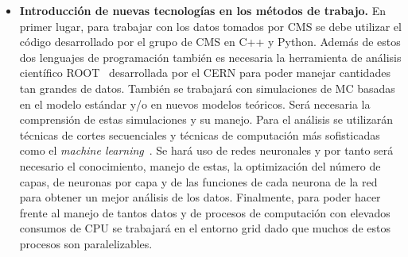 \documentclass[11pt]{articulo}
\begin{document}
\begin{itemize}
\item{{\bf Introducci\'on de nuevas tecnolog\'ias en los m\'etodos de trabajo.} En primer lugar, para trabajar con los datos tomados por CMS se debe utilizar el c\'odigo desarrollado por el grupo de CMS en C++ y Python. Adem\'as de estos dos lenguajes de programaci\'on tambi\'en es necesaria la herramienta de an\'alisis cient\'ifico ROOT~\cite{Root} desarrollada por el CERN para poder manejar cantidades tan grandes de datos. Tambi\'en se trabajar\'a con simulaciones de MC basadas en el modelo est\'andar y/o en nuevos modelos te\'oricos. Ser\'a necesaria la comprensi\'on de estas simulaciones y su manejo. Para el an\'alisis se utilizar\'an t\'ecnicas de cortes secuenciales y t\'ecnicas de computaci\'on m\'as sofisticadas como el {\it machine learning}~\cite{ML}. Se har\'a uso de redes neuronales y por tanto ser\'a necesario el conocimiento, manejo de estas, la optimizaci\'on del n\'umero de capas, de neuronas por capa y de las funciones de cada neurona de la red para obtener un mejor an\'alisis de los datos. Finalmente, para poder hacer frente al manejo de tantos datos y de procesos de computaci\'on con elevados consumos de CPU se trabajar\'a en el entorno grid dado que muchos de estos procesos son paralelizables.}

\end{itemize}
\end{document}
